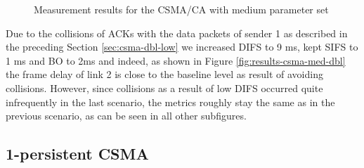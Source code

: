 \begin{figure}[tb]
\begin{center}
{		}
		\centerline{
		}		
	\end{center}
	\caption{Measurement results for the CSMA/CA with medium parameter set}
\end{figure}

Due to the collisions of ACKs with the data packets of sender 1 as described in the preceding Section \ref{sec:csma-dbl-low} we increased DIFS to 9 ms, kept SIFS to 1 ms and BO to 2ms and indeed, as shown in Figure \ref{fig:results-csma-med-dbl} the frame delay of link 2 is close to the baseline level as result of avoiding collisions. However, since collisions as a result of low DIFS occurred quite infrequently in the last scenario, the metrics roughly stay the same as in the previous scenario, as can be seen in all other subfigures.

\clearpage

\subsection{1-persistent CSMA}

